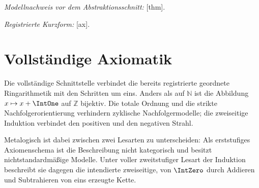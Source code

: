 \documentclass[main.tex]{subfiles}
\begin{document}
\par\noindent\emph{Modellnachweis vor dem Abstraktionsschnitt:}
[thm].\par

\par\noindent\emph{Registrierte Kurzform:}
[ax].\par

\section{Vollständige Axiomatik}

Die vollständige Schnittstelle verbindet die bereits registrierte geordnete
Ringarithmetik mit den Schritten um eins. Anders als auf \(\mathbb N\) ist
die Abbildung \(x\mapsto x+\IntOne\) auf \(\mathbb Z\) bijektiv. Die totale Ordnung und die strikte
Nachfolgerorientierung verhindern zyklische Nachfolgermodelle; die
zweiseitige Induktion verbindet den positiven und den negativen Strahl.

Metalogisch ist dabei zwischen zwei Lesarten zu unterscheiden: Als
erststufiges Axiomenschema ist die Beschreibung nicht kategorisch und
besitzt nichtstandardmäßige Modelle. Unter voller zweitstufiger Lesart der
Induktion beschreibt sie dagegen die intendierte zweiseitige, von
\(\IntZero\) durch Addieren und Subtrahieren von eins erzeugte Kette.
\end{document}
